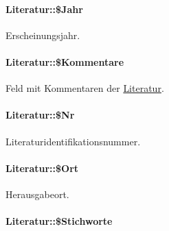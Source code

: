 \hypertarget{classLiteratur_2cb6f40a8757a0edd5da32385ad009c9}{
\paragraph[\$Jahr]{\setlength{\rightskip}{0pt plus 5cm}Literatur::\$Jahr}\hfill}
\label{classLiteratur_2cb6f40a8757a0edd5da32385ad009c9}


Erscheinungsjahr. 

\hypertarget{classLiteratur_ebcaeb5c38ce2677a14189da511fa663}{
\paragraph[\$Kommentare]{\setlength{\rightskip}{0pt plus 5cm}Literatur::\$Kommentare}\hfill}
\label{classLiteratur_ebcaeb5c38ce2677a14189da511fa663}


Feld mit Kommentaren der \hyperlink{classLiteratur}{Literatur}. 

\hypertarget{classLiteratur_036a682a93a5d50839c1ebc70a79d4b6}{
\paragraph[\$Nr]{\setlength{\rightskip}{0pt plus 5cm}Literatur::\$Nr}\hfill}
\label{classLiteratur_036a682a93a5d50839c1ebc70a79d4b6}


Literaturidentifikationsnummer. 

\hypertarget{classLiteratur_da6c458bb229187efea8e8f144a1d279}{
\paragraph[\$Ort]{\setlength{\rightskip}{0pt plus 5cm}Literatur::\$Ort}\hfill}
\label{classLiteratur_da6c458bb229187efea8e8f144a1d279}


Herausgabeort. 

\hypertarget{classLiteratur_aa77f0f697d4bcf72279aadedd91ddff}{
\paragraph[\$Stichworte]{\setlength{\rightskip}{0pt plus 5cm}Literatur::\$Stichworte}\hfill}
\label{classLiteratur_aa77f0f697d4bcf72279aadedd91ddff}


